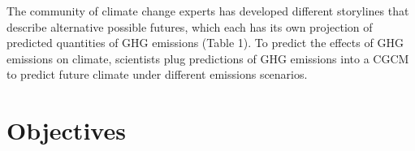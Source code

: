 \documentclass[11pt,]{article}
\begin{document}
\begin{table}[t]

\caption{\label{tab:scenario-table}Characteristics of selected emissions scenarios from the Intergovernmental Panel on Climate Change. These scenarios represent alternative possibilities for future social and technological change as envisioned by a collaboration of governmental and non-governmental analysts.}
\centering
{}
\end{table}

The community of climate change experts has developed different
storylines that describe alternative possible futures, which each has
its own projection of predicted quantities of GHG emissions (Table 1).
To predict the effects of GHG emissions on climate, scientists plug
predictions of GHG emissions into a CGCM to predict future climate under
different emissions scenarios.

\section{Objectives}\label{objectives}
\end{document}
